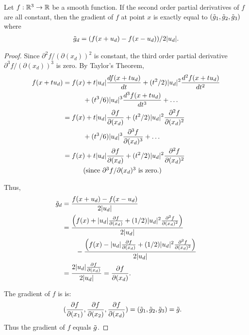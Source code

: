 \begin{proposition}
Let $f: \mathbb{R}^{3} \rightarrow \mathbb{R}$ be a smooth function.
If the second order partial derivatives of $f$ are all constant,
then the gradient of $f$ at point $x$ is exactly equal 
to $(\tilde{g}_1,\tilde{g}_2,\tilde{g}_3)$ where
\begin{align*}
\tilde{g}_d = (f(x+u_d)-f(x-u_d))/2|u_d|.
\end{align*}
\label{prop:cdiff}
\end{proposition}

\begin{proof} Since $\partial^2 f/(\partial (x_d))^2$ is constant,
the third order partial derivative $\partial^3 f/(\partial (x_d))^3$ 
is zero.
By Taylor's Theorem,
\begin{align*}
f(x+tu_d) & = f(x) + t |u_d| \frac{df(x+tu_d)}{dt} 
                   + (t^2/2) |u_d|^2 \frac{d^2f(x+tu_d)}{dt^2}
\\
  & \hspace*{3em} + (t^3/6) |u_d|^3 \frac{d^3f(x+tu_d)}{dt^3} + \ldots \\
  & = f(x) + t |u_d| \frac{\partial f}{\partial(x_d)} 
           + (t^2/2) |u_d|^2 \frac{\partial^2 f}{\partial(x_d)^2} \\
  & \hspace*{3em} 
           + (t^3/6) |u_d|^3 \frac{\partial^3 f}{\partial(x_d)^3} + \ldots \\
  & = f(x) + t |u_d| \frac{\partial f}{\partial(x_d)} 
           + (t^2/2) |u_d|^2 \frac{\partial^2 f}{\partial(x_d)^2} \\
  & \hspace*{3em} \mbox{(since $\partial^3 f/\partial(x_d)^3$ is zero.)}
\end{align*}

Thus,
\begin{align*}
\tilde{g}_d & = \frac{f(x+u_d)-f(x-u_d)}{2|u_d|} \\
      & = \frac{\left ( f(x) + |u_d|\frac{\partial f}{\partial(x_d)} 
             + (1/2) |u_d|^2 \frac{\partial^2 f}{\partial(x_d)^2} \right )}
           {2 |u_d|} \\
      & \hspace*{2em}
           - \frac{\left ( f(x) - |u_d| \frac{\partial f}{\partial(x_d)} 
             + (1/2) |u_d|^2 \frac{\partial^2 f}{\partial(x_d)^2} \right )}
           {2|u_d|} 
\\
      & = \frac{2 |u_d| \frac{\partial f}{\partial(x_d)}}{2 |u_d|}
        = \frac{\partial f}{\partial(x_d)}.
\end{align*}

The gradient of $f$ is is:
\begin{align*}
(\frac{\partial f}{\partial(x_1)}, \frac{\partial f}{\partial(x_2)}, 
  \frac{\partial f}{\partial(x_d)}) & = 
( \tilde{g}_1, \tilde{g}_2, \tilde{g}_3) = \tilde{g}.
\end{align*}
Thus the gradient of $f$ equals $\tilde{g}$.
\end{proof}

